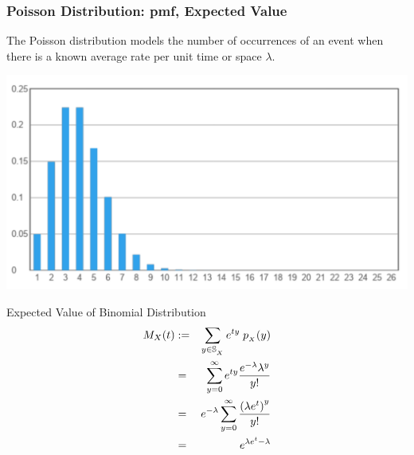 \documentclass[compress]{beamer}
\begin{document}
\begin{frame}\frametitle{Poisson Distribution: pmf, Expected Value }
The Poisson distribution models the number of occurrences of an
event when there is a known average rate per unit time or space $\lambda$.

\end{frame}


\begin{frame}
\vspace{1in}
\includegraphics[scale=.3]{figs/PoissonExample1.png}
\end{frame}



\begin{frame}{Expected Value of Binomial Distribution}
\begin{eqnarray}
M_X(t)& := &  \sum_{y\in \support[X]} e^{ty}\; \pmf_{_X}(y) \nonumber\\
& = &  \sum_{y=0}^{\infty} e^{ty} \frac{e^{-\lambda} \lambda^y}{y!} \nonumber\\
& = &  e^{-\lambda}\sum_{y=0}^{\infty}  \frac{ \left( \lambda e^t\right)^y}{y!} \nonumber\\
& = &  e^{\lambda e^t-\lambda}
\end{eqnarray}



\end{frame}
\end{document}
